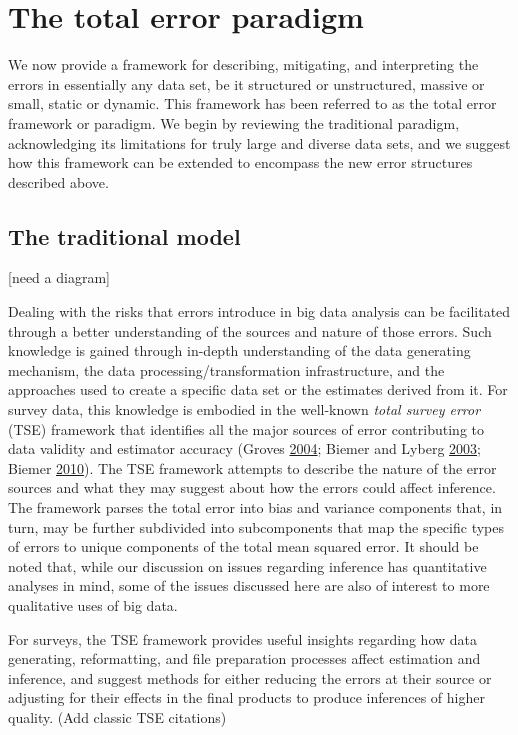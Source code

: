 \documentclass[]{krantz}
\begin{document}
\section{The total error paradigm}\label{sec:10-2}

We now provide a framework for describing, mitigating, and interpreting
the errors in essentially any data set, be it structured or
unstructured, massive or small, static or dynamic. This framework has
been referred to as the total error framework or paradigm. We begin by
reviewing the traditional paradigm, acknowledging its limitations for
truly large and diverse data sets, and we suggest how this framework can
be extended to encompass the new error structures described above.

\subsection{The traditional model}\label{sec:10-2.1}

{[}need a diagram{]}

Dealing with the risks that errors introduce in big data analysis can be
facilitated through a better understanding of the sources and nature of
those errors. Such knowledge is gained through in-depth understanding of
the data generating mechanism, the data processing/transformation
infrastructure, and the approaches used to create a specific data set or
the estimates derived from it. For survey data, this knowledge is
embodied in the well-known \emph{total survey error} (TSE) framework
that identifies all the major sources of error contributing to data
validity and estimator accuracy (Groves
\protect\hyperlink{ref-groves2004survey}{2004}; Biemer and Lyberg
\protect\hyperlink{ref-biemer2003}{2003}; Biemer
\protect\hyperlink{ref-biemer2010total}{2010}). The TSE framework
attempts to describe the nature of the error sources and what they may
suggest about how the errors could affect inference. The framework
parses the total error into bias and variance components that, in turn,
may be further subdivided into subcomponents that map the specific types
of errors to unique components of the total mean squared error. It
should be noted that, while our discussion on issues regarding inference
has quantitative analyses in mind, some of the issues discussed here are
also of interest to more qualitative uses of big data.

For surveys, the TSE framework provides useful insights regarding how
data generating, reformatting, and file preparation processes affect
estimation and inference, and suggest methods for either reducing the
errors at their source or adjusting for their effects in the final
products to produce inferences of higher quality. (Add classic TSE
citations)
\end{document}
